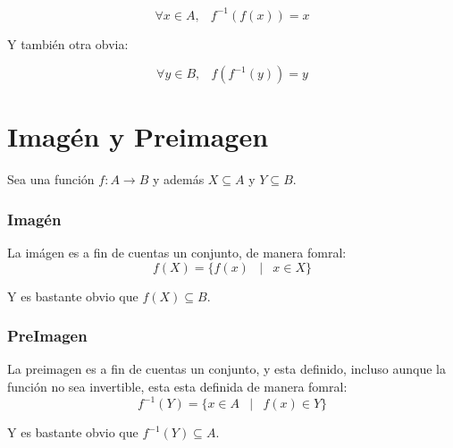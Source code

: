 \documentclass[12pt]{report}                                    %
\DeclareMathOperator \Space {\quad}                             %
\DeclareMathOperator \MiniSpace {\;}                            %
\newcommand \Such {\MiniSpace|\MiniSpace}                       %
\begin{document}
        \begin{equation}
            \forall x \in A, \MiniSpace f^{-1}(f(x)) = x
        \end{equation}

        Y también otra obvia:

        \begin{equation}
            \forall y \in B, \MiniSpace f(f^{-1}(y)) = y
        \end{equation}




    \clearpage
    \section{Imagén y Preimagen}

        Sea una función $f : A \to B$ y además $X \subseteq A$ y $Y \subseteq B$.  

        \subsubsection{Imagén}
            La imágen es a fin de cuentas un conjunto, de manera fomral:
            \begin{equation} 
                f(X) = \{ f(x) \Such x \in X \} 
            \end{equation} 

            Y es bastante obvio que $f(X) \subseteq B$.

        \subsubsection{PreImagen}
            La preimagen es a fin de cuentas un conjunto, y esta definido,
            incluso aunque la función no sea invertible, esta esta definida
            de manera fomral:
            \begin{equation} 
                f^{-1}(Y) = \{ x \in A \Such f(x) \in Y \} 
            \end{equation} 

            Y es bastante obvio que $f^{-1}(Y) \subseteq A$.





    \clearpage
\end{document}

